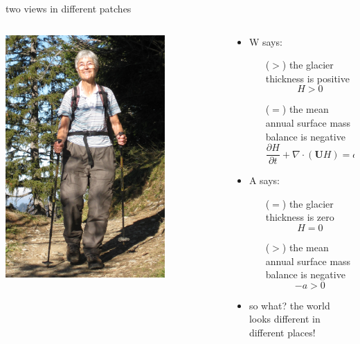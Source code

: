 \documentclass[10pt,hyperref,dvipsnames]{beamer}
\newcommand{\bU}{\mathbf{U}}
\newcommand{\Div}{\nabla\cdot}
\begin{document}
\begin{frame}{two views in different patches}
\begin{columns}
\begin{column}{0.25\textwidth}
\vspace{5mm}
\includegraphics[width=0.75\textwidth]{figs/Iken_front_crop.jpg}
\end{column}
\begin{column}{0.75\textwidth}
\begin{itemize}
\item W says:
    \begin{itemize}
    \item[($>$)] the glacier thickness is positive
        $$H>0$$
    \item[($=$)] the mean annual surface mass balance is negative
        $$\frac{\partial H}{\partial t} + \Div \left(\bU H\right) = a$$
    \end{itemize}
\item A says:
    \begin{itemize}
    \item[($=$)] the glacier thickness is zero
        $$H=0$$
    \item[($>$)] the mean annual surface mass balance is negative
        $$-a > 0$$
    \end{itemize}
\item<2> so what?  the world looks different in different places!
\end{itemize}
\end{column}
\end{columns}
\end{frame}
\end{document}
